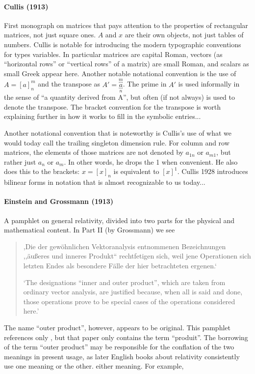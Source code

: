 \paragraph{Cullis (1913)}

First monograph on matrices that pays attention to the properties of
rectangular matrices, not just square ones. $A$ and $x$ are their own objects,
not just tables of numbers.
Cullis is notable for introducing the modern typographic conventions for types
variables. In particular matrices are capital Roman, vectors (as ``horizontal
rows'' or ``vertical rows'' of a matrix) are small Roman, and scalars as small
Greek appear here.  Another notable notational convention is the use of $A =
{[a]}^m_n$ and the transpose as $A' = \overbracket{\underbracket{a}}^m_n$. The
prime in $A'$ is used informally in the sense of ``a quantity derived from A'',
but often (if not always) is used to denote the transpose.
The bracket convention for the transpose is worth explaining further in how it
works to fill in the symbolic entries...

Another notational convention that is noteworthy is Cullis's use of what we
would today call the trailing singleton dimension rule. For column and row
matrices, the elements of those matrices are not denoted by $a_{1n}$ or
$a_{m1}$, but rather just $a_n$ or $a_m$. In other words, he drops the 1 when
convenient. He also does this to the brackets: $x = {[x]}_n$ is equivalent to
${[x]}^1$.
Cullis 1928 introduces bilinear forms in notation that is almost recognizable to us today...



\paragraph{Einstein and Grossmann (1913)}

A pamphlet on general relativity, divided into two parts for the physical and mathematical content. In Part II (by Grossmann) we see

\begin{quote}

,Die der gewöhnlichen Vektoranalysis entnommenen Bezeichnungen ,,äußeres und inneres Produkt`` rechtfetigen sich, weil jene Operationen sich letzten Endes als besondere Fälle der hier betrachteten ergenen.`~\cite[p. 26]{Einstein1913}\cite[p. 327]{Einstein1995}

`The designations ``inner and outer product'', which are taken from ordinary vector analysis, are justified because, when all is said and done, those operations prove to be special cases of the operations considered here.'~\cite[p. 175]{Einstein1996}
\end{quote}
The name ``outer product'', however, appears to be original. This pamphlet references only \cite{Ricci1900}, but that paper only contains the term ``produit''.
The borrowing of the term ``outer product'' may be responsible for the conflation of the two meanings in present usage, as later English books about relativity consistently use one meaning or the other. either meaning. For example,

